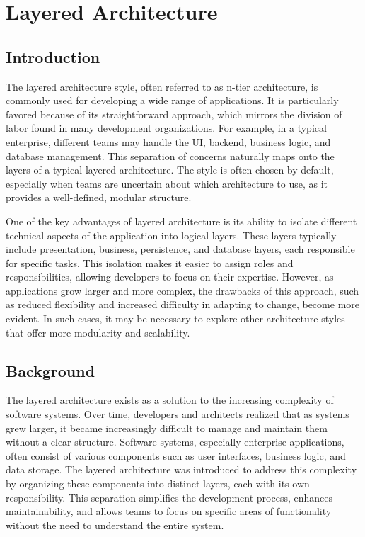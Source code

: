 \chapter{Layered Architecture}


\section{Introduction}

The layered architecture style, often referred to as n-tier architecture, is commonly used for developing a wide range of applications. It is particularly favored because of its straightforward approach, which mirrors the division of labor found in many development organizations. For example, in a typical enterprise, different teams may handle the UI, backend, business logic, and database management. This separation of concerns naturally maps onto the layers of a typical layered architecture. The style is often chosen by default, especially when teams are uncertain about which architecture to use, as it provides a well-defined, modular structure.

One of the key advantages of layered architecture is its ability to isolate different technical aspects of the application into logical layers. These layers typically include presentation, business, persistence, and database layers, each responsible for specific tasks. This isolation makes it easier to assign roles and responsibilities, allowing developers to focus on their expertise. However, as applications grow larger and more complex, the drawbacks of this approach, such as reduced flexibility and increased difficulty in adapting to change, become more evident. In such cases, it may be necessary to explore other architecture styles that offer more modularity and scalability.

\section{Background}

The layered architecture exists as a solution to the increasing complexity of software systems. Over time, developers and architects realized that as systems grew larger, it became increasingly difficult to manage and maintain them without a clear structure. Software systems, especially enterprise applications, often consist of various components such as user interfaces, business logic, and data storage. The layered architecture was introduced to address this complexity by organizing these components into distinct layers, each with its own responsibility. This separation simplifies the development process, enhances maintainability, and allows teams to focus on specific areas of functionality without the need to understand the entire system.

